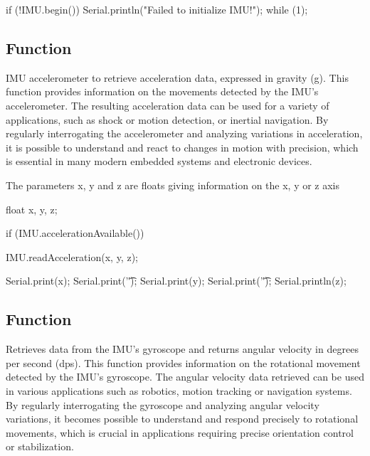 \begin{Arduino}
	if (!IMU.begin()) {
		Serial.println("Failed to initialize IMU!");
		while (1); }
	
\end{Arduino}


\subsection{Function }

IMU accelerometer to retrieve acceleration data, expressed in gravity (g). This function provides information on the movements detected by the IMU's accelerometer. The resulting acceleration data can be used for a variety of applications, such as shock or motion detection, or inertial navigation. By regularly interrogating the accelerometer and analyzing variations in acceleration, it is possible to understand and react to changes in motion with precision, which is essential in many modern embedded systems and electronic devices. \cite{adafruit_lsm9ds1:2024}

The parameters x, y and z are floats giving information on the x, y or z axis 

\begin{Arduino}
	
	float x, y, z;
	
	if (IMU.accelerationAvailable()) {
		IMU.readAcceleration(x, y, z);
		
		Serial.print(x);
		Serial.print('\t');
		Serial.print(y);
		Serial.print('\t');
		Serial.println(z);	}
\end{Arduino}



\subsection{Function }

Retrieves data from the IMU's gyroscope and returns angular velocity in degrees per second (dps). This function provides information on the rotational movement detected by the IMU's gyroscope. The angular velocity data retrieved can be used in various applications such as robotics, motion tracking or navigation systems. By regularly interrogating the gyroscope and analyzing angular velocity variations, it becomes possible to understand and respond precisely to rotational movements, which is crucial in applications requiring precise orientation control or stabilization. \cite{adafruit_lsm9ds1:2024}

